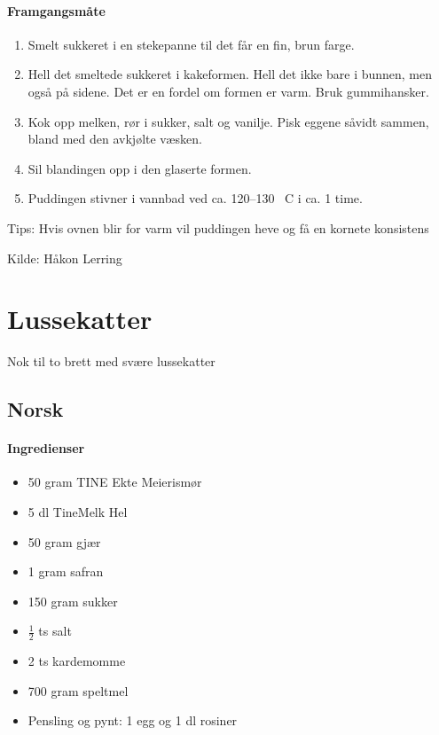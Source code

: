 \documentclass[12pt,a4paper]{book}
\begin{document}
\paragraph{Framgangsmåte}
\begin{enumerate}
	\item Smelt sukkeret i en stekepanne til det får en fin, brun farge. \item Hell det smeltede sukkeret i kakeformen. Hell det ikke bare i bunnen, men også på sidene. Det er en fordel om formen er varm. Bruk gummihansker.
	\item Kok opp melken, rør i sukker, salt og vanilje. Pisk eggene såvidt sammen, bland med den avkjølte væsken.
	\item Sil blandingen opp i den glaserte formen.
	\item Puddingen stivner i vannbad ved ca. 120--130 \degree~C i ca. 1 time.

\end{enumerate}


Tips: Hvis ovnen blir for varm vil puddingen heve og få en kornete konsistens


Kilde: Håkon Lerring
\clearpage{}
\clearpage{}\section{﻿Lussekatter}
Nok til to brett med svære lussekatter
\subsection{Norsk}

\paragraph{Ingredienser}
\begin{itemize}[noitemsep]
	\item 50 gram TINE Ekte Meierismør
	\item 5 dl TineMelk Hel
	\item 50 gram gjær
	\item 1 gram safran
	\item 150 gram sukker
	\item $\frac{1}{2}$ ts salt
	\item 2 ts kardemomme
	\item 700 gram speltmel
	\item Pensling og pynt: 1 egg og 1 dl rosiner
\end{itemize}
\end{document}
